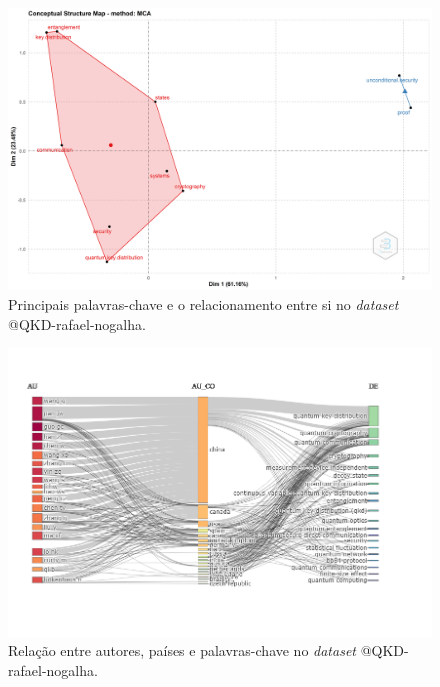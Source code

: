 \begin{figure}[H]
    \centering
    \includegraphics[width=1\textwidth]{experiments/rafaelnogalha/PesquisaBibliografica/QKDSegurancaComputacional/images/mapa_fatorial.png}
    \caption{Principais palavras-chave e o relacionamento entre si no \textit{dataset} @QKD-rafael-nogalha.}
    \label{fig:mapa:fatorial:@QKD-rafael-nogalha}
\end{figure}

\begin{figure}[H]
    \centering
    \includegraphics[width=1\textwidth]{experiments/rafaelnogalha/PesquisaBibliografica/QKDSegurancaComputacional/images/three_fields_plot_qkd.png}
    \caption{Relação entre autores, países e palavras-chave no \textit{dataset} @QKD-rafael-nogalha.}
    \label{fig:three:plot:@QKD-rafael-nogalha}
\end{figure}


